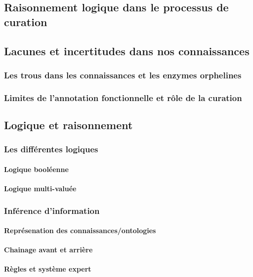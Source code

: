\begin{refsection}
    \section{Raisonnement logique dans le processus de curation}
    \subsection{Lacunes et incertitudes dans nos connaissances}
    \subsubsection{Les trous dans les connaissances et les enzymes orphelines}
    \subsubsection{Limites de l’annotation fonctionnelle et rôle de la curation}
    \subsection{Logique et raisonnement}
    \subsubsection{Les différentes logiques}
    \paragraph{Logique booléenne}
    \paragraph{Logique multi-valuée}
    \subsubsection{Inférence d’information}
    \paragraph{Représenation des connaissances/ontologies}
    \paragraph{Chainage avant et arrière} %
    \paragraph{Règles et système expert}
    

\end{refsection}
